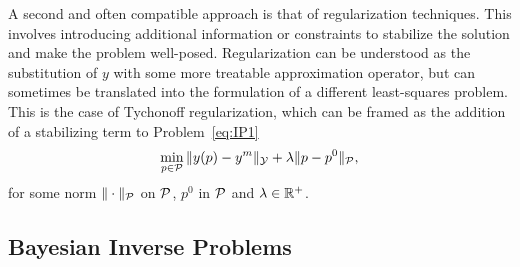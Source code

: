 A second and often compatible approach is that of regularization techniques. This involves introducing additional information or constraints to stabilize the solution and make the problem well-posed. Regularization can be understood as the substitution of $y$ with some more treatable approximation operator, but can sometimes be translated into the formulation of a different least-squares problem. This is the case of Tychonoff regularization, which can be framed as the addition of a stabilizing term to Problem~\ref{eq:IP1}
\begin{equation}\label{eq:Tycho}
    \min_{p\in \mathcal P} \| y(p) - y^m \|_\mathcal Y + \lambda\| p - p^0 \|_\mathcal P,
\end{equation}
for some norm $\|\cdot\|_\mathcal P$ on $\mathcal P$, $p^0$ in $\mathcal P$ and $\lambda \in \mathbb{R}^+$.


\subsection{Bayesian Inverse Problems}\label{sec:BIP}